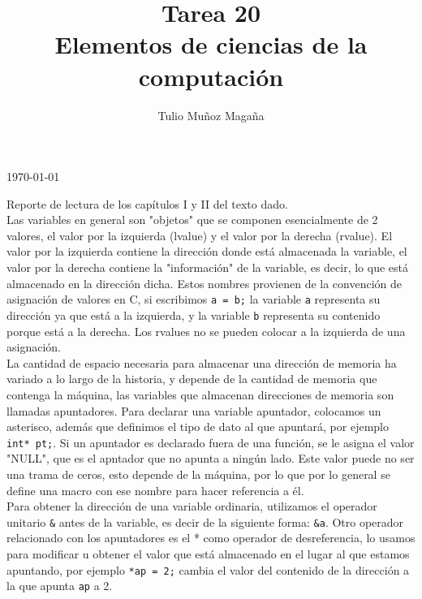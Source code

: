 \documentclass[12pt]{article}
\begin{document}
\title{Tarea 20\\
	\large Elementos de ciencias de la computación}

\author{Tulio Muñoz Magaña}
\today
\maketitle

Reporte de lectura de los capítulos I y II del texto dado.\\

Las variables en general son "objetos" que se componen esencialmente de 2 valores, el valor por la izquierda (lvalue) y el valor por la derecha (rvalue). El valor por la izquierda contiene la dirección donde está almacenada la variable, el valor por la derecha contiene la "información" de la variable, es decir, lo que está almacenado en la dirección dicha. Estos nombres provienen de la convención de asignación de valores en C, si escribimos \texttt{a = b;} la variable \texttt{a} representa su dirección ya que está a la izquierda, y la variable \texttt{b} representa su contenido porque está a la derecha. Los rvalues no se pueden colocar a la izquierda de una asignación.\\

La cantidad de espacio necesaria para almacenar una dirección de memoria ha variado a lo largo de la historia, y depende de la cantidad de memoria que contenga la máquina, las variables que almacenan direcciones de memoria son llamadas apuntadores. Para declarar una variable apuntador, colocamos un asterisco, además que definimos el tipo de dato al que apuntará, por ejemplo \texttt{ int* pt;}. Si un apuntador es declarado fuera de una función, se le asigna el valor "NULL", que es el apntador que no apunta a ningún lado. Este valor puede no ser una trama de ceros, esto depende de la máquina, por lo que por lo general se define una macro con ese nombre para hacer referencia a él.\\

Para obtener la dirección de una variable ordinaria, utilizamos el operador unitario \texttt{\&} antes de la variable, es decir de la siguiente forma: \texttt{\&a}. Otro operador relacionado con los apuntadores es el * como operador de desreferencia, lo usamos para modificar u obtener el valor que está almacenado en el lugar al que estamos apuntando, por ejemplo \texttt{*ap = 2;} cambia el valor del contenido de la dirección a la que apunta \texttt{ap} a 2.\\
\end{document}
